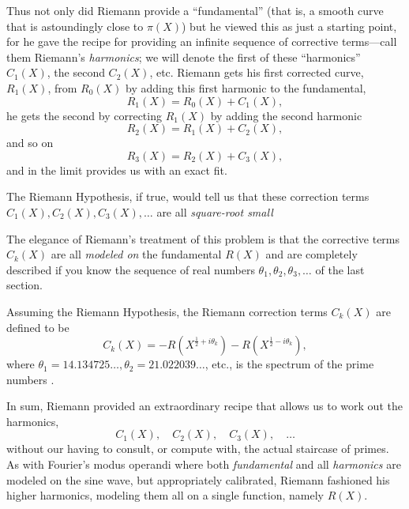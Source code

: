 \documentclass[openany]{book}
\theoremstyle{plain}
\theoremstyle{definition}
\newcommand{\RH}{Riemann Hypothesis\index{Riemann Hypothesis}}
\begin{document}
{{Thus not only did Riemann provide a ``fundamental'' (that is, a smooth curve
that is astoundingly close to $\pi(X)$) but he viewed this as just a
starting point, for he gave the recipe for providing an infinite
sequence of corrective terms---call them Riemann's {\em harmonics}; we
will denote the first of these ``harmonics'' $C_1(X)$, the second
$C_2(X)$, etc.  Riemann gets his first corrected curve, $R_1(X)$, from
$R_0(X)$ by adding this first harmonic to the fundamental, $$R_1(X) =
R_0(X) + C_1(X),$$ he gets the second by correcting $R_1(X)$ by adding
the second harmonic $$R_2(X) = R_1 (X) + C_2(X),$$ and so on $$R_3(X)
= R_2 (X) + C_3(X),$$ and in the limit provides us with an exact fit.


The \RH{}, if true, would tell us that these correction
terms $C_1(X), C_2(X), C_3(X),\dots$ are all {\em square-root small}

The elegance of Riemann's treatment of this problem is that the
corrective terms $C_k(X)$ are all {\em modeled on} the fundamental
$R(X)$ and are completely described if you know the sequence of real
numbers $\theta_1, \theta_2, \theta_3,\dots$ of the last section.


  Assuming the \RH{}, the Riemann correction
terms $C_k(X)$ are defined to be
$$
   C_k(X)= -R(X^{\frac{1}{2} + i\theta_k}) -R(X^{\frac{1}{2} - i\theta_k}),
$$
where $\theta_1 = 14.134725\dots, \theta_2 = 21.022039\dots$, etc.,
is the spectrum of the prime numbers .

In sum, Riemann provided an extraordinary recipe that allows us to work
out the harmonics, $$C_1(X),\quad C_2(X),\quad C_3(X),\quad \dots$$ without our having
to consult, or compute with, the actual staircase of primes. As with
Fourier's modus operandi where both {\em fundamental} and all {\em
  harmonics} are modeled on the sine wave, but appropriately
calibrated, Riemann fashioned his higher harmonics, modeling them all
on a single function, namely  $R(X)$.

}}
\end{document}
